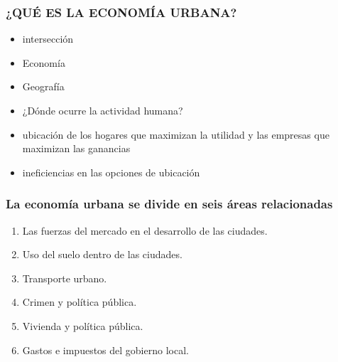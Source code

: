 \documentclass{beamer}
\begin{document}

\begin{frame}
\frametitle{¿QUÉ ES LA ECONOMÍA URBANA?}
\begin{itemize}
\item intersección
\item Economía
\item Geografía 
\item ¿Dónde ocurre la actividad humana?
\item ubicación de los hogares que maximizan la utilidad y las empresas que maximizan las ganancias
\item ineficiencias en las opciones de ubicación
\end{itemize}
\end{frame}


\begin{frame}
  \frametitle{La economía urbana se divide en seis áreas relacionadas}
  \begin{enumerate}
  \item Las fuerzas del mercado en el desarrollo de las ciudades.
  \item Uso del suelo dentro de las ciudades.
  \item Transporte urbano. 
  \item Crimen y política pública.
  \item Vivienda y política pública.
  \item Gastos e impuestos del gobierno local.
  \end{enumerate}
  \end{frame}
  
\end{document}
